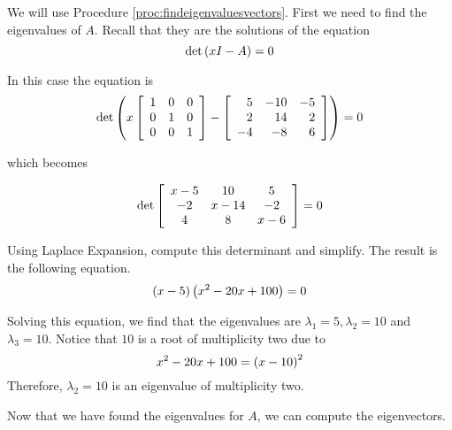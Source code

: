 \begin{solution}
We will use Procedure \ref{proc:findeigenvaluesvectors}.
First we need to find the eigenvalues of $A$. Recall that they are the
solutions of the equation
\begin{equation*}
\det \left( x I - A \right) =0
\end{equation*}

In this case the equation is
\begin{equation*}
\det \left( 
x \left[
\begin{array}{rrr}
1 & 0 & 0 \\
0 & 1 & 0 \\
0 & 0 & 1
\end{array}
\right]
-
\left[
\begin{array}{rrr}
5 & -10 & -5 \\
2 & 14 & 2 \\
-4 & -8 & 6
\end{array}
\right]  \right) =0
\end{equation*}

which becomes

\begin{equation*}
\det \left[
\begin{array}{ccc}
x - 5 & 10 & 5 \\
-2 & x - 14  & -2 \\
4 & 8 & x - 6
\end{array}
\right] = 0
\end{equation*}

Using Laplace Expansion, compute this determinant and simplify.
The result is the following equation.
\begin{equation*}
\left( x -5\right) \left( x ^{2}-20x +100\right) =0
\end{equation*}

Solving this equation, we find that the eigenvalues are $\lambda_1 = 5, \lambda_2=10$ and
$\lambda_3=10$. Notice that $10$ is a root of multiplicity two due to
\begin{equation*}
x ^{2}-20x +100=\left( x -10\right) ^{2}
\end{equation*}
Therefore, $\lambda_2 = 10$ is an eigenvalue of multiplicity two. 

Now that we have found the eigenvalues for $A$, we can compute the eigenvectors.


\end{solution}
